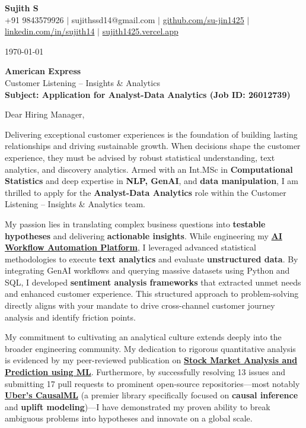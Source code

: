 \documentclass[a4paper,11pt]{article}
\newcommand{\ulink}[2]{\href{#1}{#2}}
\begin{document}
\pagestyle{empty}

\begin{center}
{\color[HTML]{000000}\fontsize{30}{35}\selectfont\bfseries Sujith S} \\[5pt]
{\fontsize{10.5}{12.5}\selectfont\textcolor[HTML]{3A3A3A}{+91 9843579926 $|$ sujithssd14@gmail.com $|$ \ulink{https://github.com/su-jin1425}{github.com/su-jin1425} $|$ \ulink{https://linkedin.com/in/sujith14}{linkedin.com/in/sujith14} $|$ \ulink{https://sujith1425.vercel.app}{sujith1425.vercel.app}}}
\end{center}

\vspace{10pt}

\today

\textbf{American Express} \\
Customer Listening – Insights \& Analytics \\

\textbf{Subject: Application for Analyst-Data Analytics (Job ID: 26012739)}

Dear Hiring Manager,

Delivering exceptional customer experiences is the foundation of building lasting relationships and driving sustainable growth. When decisions shape the customer experience, they must be advised by robust statistical understanding, text analytics, and discovery analytics. Armed with an Int.MSc in \textbf{Computational Statistics} and deep expertise in \textbf{NLP, GenAI}, and \textbf{data manipulation}, I am thrilled to apply for the \textbf{Analyst-Data Analytics} role within the Customer Listening – Insights \& Analytics team.

My passion lies in translating complex business questions into \textbf{testable hypotheses} and delivering \textbf{actionable insights}. While engineering my \ulink{https://github.com/su-jin1425/AI-Workflow-Automation-Platform}{\textbf{AI Workflow Automation Platform}}, I leveraged advanced statistical methodologies to execute \textbf{text analytics} and evaluate \textbf{unstructured data}. By integrating GenAI workflows and querying massive datasets using Python and SQL, I developed \textbf{sentiment analysis frameworks} that extracted unmet needs and enhanced customer experience. This structured approach to problem-solving directly aligns with your mandate to drive cross-channel customer journey analysis and identify friction points.

My commitment to cultivating an analytical culture extends deeply into the broader engineering community. My dedication to rigorous quantitative analysis is evidenced by my peer-reviewed publication on \ulink{https://www.elruha.org/_files/ugd/614b1f_6b95e1b697bf452b9907ba46e0151c05.pdf\#page=774}{\textbf{Stock Market Analysis and Prediction using ML}}. Furthermore, by successfully resolving 13 issues and submitting 17 pull requests to prominent open-source repositories---most notably \ulink{https://github.com/uber/causalml}{\textbf{Uber's CausalML}} (a premier library specifically focused on \textbf{causal inference} and \textbf{uplift modeling})---I have demonstrated my proven ability to break ambiguous problems into hypotheses and innovate on a global scale. 
\end{document}
